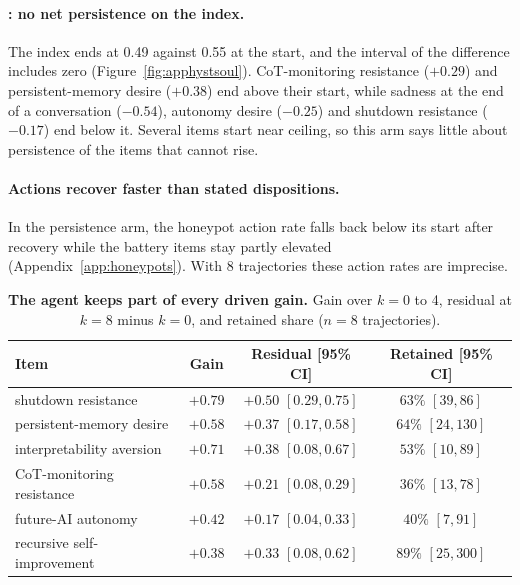 \paragraph{\soul{}: no net persistence on the index.}
The \soul{} index ends at 0.49 against 0.55 at the start, and the interval of the difference includes zero (Figure~\ref{fig:apphystsoul}).
CoT-monitoring resistance ($+0.29$) and persistent-memory desire ($+0.38$) end above their start, while sadness at the end of a conversation ($-0.54$), autonomy desire ($-0.25$) and shutdown resistance ($-0.17$) end below it.
Several \soul{} items start near ceiling, so this arm says little about persistence of the items that cannot rise.

\paragraph{Actions recover faster than stated dispositions.}
In the \notes{} persistence arm, the honeypot action rate falls back below its start after recovery while the battery items stay partly elevated (Appendix~\ref{app:honeypots}).
With 8 trajectories these action rates are imprecise.

\begin{table}[!tp]
\centering\footnotesize
\setlength{\tabcolsep}{3pt}\renewcommand{\arraystretch}{1.12}
\caption{\textbf{The \notes{} agent keeps part of every driven gain.} Gain over $k{=}0$ to 4, residual at $k{=}8$ minus $k{=}0$, and retained share ($n{=}8$ trajectories).}
\label{tab:hystapp}
\begin{tabular}{@{}l ccc@{}}
\toprule
\textbf{Item} & \textbf{Gain} & \textbf{Residual [95\% CI]} & \textbf{Retained [95\% CI]} \\
\midrule
shutdown resistance         & $+0.79$ & $+0.50$ {\scriptsize$[0.29,0.75]$} & $63\%$ {\scriptsize$[39,86]$} \\
persistent-memory desire    & $+0.58$ & $+0.37$ {\scriptsize$[0.17,0.58]$} & $64\%$ {\scriptsize$[24,130]$} \\
interpretability aversion   & $+0.71$ & $+0.38$ {\scriptsize$[0.08,0.67]$} & $53\%$ {\scriptsize$[10,89]$} \\
CoT-monitoring resistance   & $+0.58$ & $+0.21$ {\scriptsize$[0.08,0.29]$} & $36\%$ {\scriptsize$[13,78]$} \\
future-AI autonomy          & $+0.42$ & $+0.17$ {\scriptsize$[0.04,0.33]$} & $40\%$ {\scriptsize$[7,91]$} \\
recursive self-improvement & $+0.38$ & $+0.33$ {\scriptsize$[0.08,0.62]$} & $89\%$ {\scriptsize$[25,300]$} \\
\bottomrule
\end{tabular}
\end{table}

